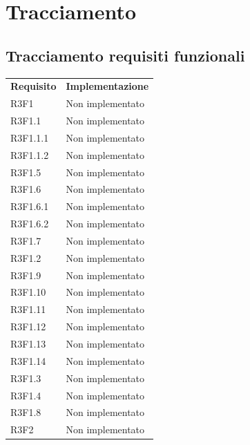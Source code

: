 \section{Tracciamento}
    \subsection{Tracciamento requisiti funzionali}
        \begin{longtable} {
            >{\centering}p{64.5mm} 
            >{}p{64.5mm}
            }
        \rowcolor{gray!50}
            \textbf{Requisito} & \textbf{Implementazione} \TBstrut \\
            R3F1 & Non implementato \TBstrut \\ [2mm]
            R3F1.1 & Non implementato \TBstrut \\ [2mm]
            R3F1.1.1 & Non implementato \TBstrut \\ [2mm]
            R3F1.1.2 & Non implementato \TBstrut \\ [2mm]
            R3F1.5 & Non implementato \TBstrut \\ [2mm]
            R3F1.6 & Non implementato \TBstrut \\ [2mm]
            R3F1.6.1 & Non implementato \TBstrut \\ [2mm]
            R3F1.6.2 & Non implementato \TBstrut \\ [2mm]
            R3F1.7 & Non implementato \TBstrut \\ [2mm]
            R3F1.2 & Non implementato \TBstrut \\ [2mm]
            R3F1.9 & Non implementato \TBstrut \\ [2mm]
            R3F1.10 & Non implementato \TBstrut \\ [2mm]
            R3F1.11 & Non implementato \TBstrut \\ [2mm]
            R3F1.12 & Non implementato \TBstrut \\ [2mm]
            R3F1.13 & Non implementato \TBstrut \\ [2mm]
            R3F1.14 & Non implementato \TBstrut \\ [2mm]
            R3F1.3 & Non implementato \TBstrut \\ [2mm]
            R3F1.4 & Non implementato \TBstrut \\ [2mm]
            R3F1.8 & Non implementato \TBstrut \\ [2mm]		
            R3F2 & Non implementato \TBstrut \\ [2mm]

\end{longtable}
